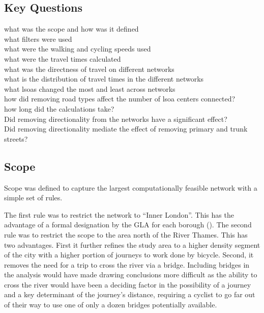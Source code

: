 
\subsection{Key Questions}
what was the scope and how was it defined \\
what filters were used \\
what were the walking and cycling speeds used \\
what were the travel times calculated \\
what was the directness of travel on different networks \\
what is the distribution of travel times in the different networks \\
what lsoas changed the most and least across networks \\
how did removing road types affect the number of lsoa centers connected? \\
how long did the calculations take? \\
Did removing directionality from the networks have a significant effect? \\
Did removing directionality mediate the effect of removing primary and trunk streets? \\


\subsection{Scope}


Scope was defined to capture the largest computationally feasible network with a simple set of rules. 

The first rule was to restrict the network to ``Inner London''. This has the advantage of a formal designation by the GLA for each borough (\cite{innerlondon}). The second rule was to restrict the scope to the area north of the River Thames. This has two advantages. First it further refines the study area to a higher density segment of the city with a higher portion of journeys to work done by bicycle. Second, it removes the need for a trip to cross the river via a bridge. Including bridges in the analysis would have made drawing conclusions more difficult as the ability to cross the river would have been a deciding factor in the possibility of a journey and a key determinant of the journey's distance, requiring a cyclist to go far out of their way to use one of only a dozen bridges potentially available. 

